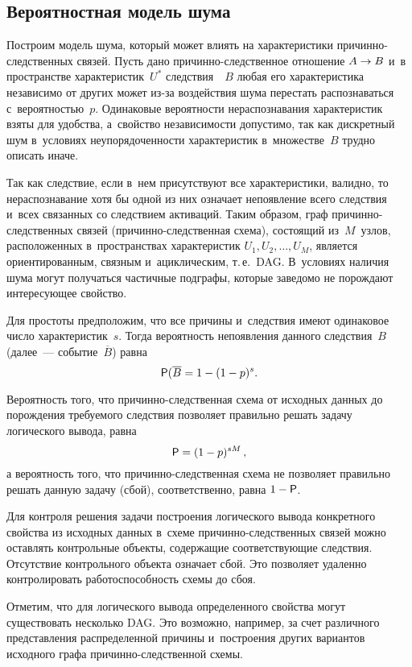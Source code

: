 \begin{multicols}{2}
{}
  
  \section{Вероятностная модель шума }
  
  Построим модель шума, который может влиять на характеристики 
 при\-чин\-но-след\-ст\-вен\-ных связей. Пусть дано  
при\-чин\-но-след\-ст\-вен\-ное отношение $A\hm\to B$ и~в пространстве 
характеристик~$U^*$ следствия~~$B$ любая его характеристика независимо от 
других может из-за воздействия шума перестать распознаваться 
с~вероятностью~$p$. Одинаковые вероятности нераспознавания характеристик 
взяты для удобства, а~свойство независимости допустимо, так как дискретный 
шум в~условиях неупорядоченности характеристик в~множестве~$B$ трудно 
описать иначе. 
  
  Так как следствие, если в~нем присутствуют все характеристики, валидно, то 
нераспознавание хотя бы одной из них означает непоявление всего следствия 
и~всех связанных со следствием активаций. Таким образом, граф  
при\-чин\-но-след\-ст\-вен\-ных связей (при\-чин\-но-след\-ст\-вен\-ная схема), 
состоящий из~$M$~узлов, расположенных в~пространствах характеристик $U_1, 
U_2,\ldots , U_M$, является ориентированным, связным и~ациклическим, т.\,е.\ 
DAG. В~условиях наличия шума могут получаться частичные подграфы, которые 
заведомо не порождают интересующее свойство.
  
  Для простоты предположим, что все причины и~следствия имеют одинаковое 
число характеристик~$s$. Тогда вероятность непоявления данного следствия~$B$ 
(далее~--- событие~$\overline{B}$) равна
  $$
  {\sf P}(\overline{B} =1-(1-p)^s.
  $$
  
  Вероятность того, что при\-чин\-но-след\-ст\-вен\-ная схема от исходных 
данных до порождения тре\-бу\-емо\-го следствия позволяет правильно решать задачу 
логического вывода, равна
  $$
  {\sf P}=(1-p)^{sM}\,,
  $$
а вероятность того, что причинно-следственная схема не позволяет правильно 
решать данную задачу (сбой), соответственно, равна $1\hm-{\sf P}$. 

  Для контроля решения задачи построения логического вывода конкретного 
свойства из исходных данных в~схеме при\-чин\-но-след\-ст\-вен\-ных связей 
можно оставлять контрольные объекты, содержащие соответствующие следствия. 
Отсутствие контрольного объекта означает сбой. Это позволяет удаленно 
контролировать работоспособность схемы до сбоя.
  
  Отметим, что для логического вывода определенного свойства могут 
существовать несколько DAG. Это возможно, например, за счет различного 
представления распределенной причины и~построения других вариантов 
исходного графа при\-чин\-но-след\-ст\-вен\-ной схемы.
  

\end{multicols}
